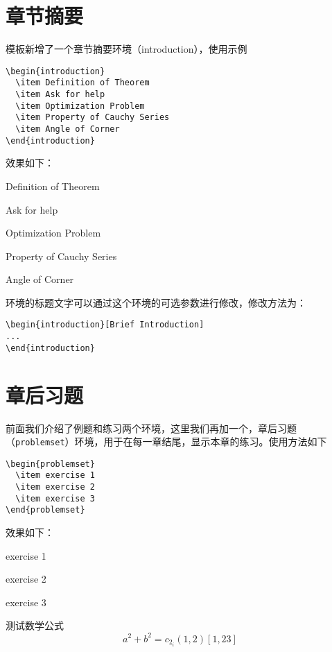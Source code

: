 \documentclass[cn,10pt,math=newtx,citestyle=gb7714-2015,bibstyle=gb7714-2015]{elegantbook}
\begin{document}
\section{章节摘要}
模板新增了一个章节摘要环境（introduction），使用示例
\begin{lstlisting}
\begin{introduction}
  \item Definition of Theorem
  \item Ask for help
  \item Optimization Problem
  \item Property of Cauchy Series
  \item Angle of Corner
\end{introduction}
\end{lstlisting}
效果如下：
\begin{introduction}
  \item Definition of Theorem
  \item Ask for help
  \item Optimization Problem
  \item Property of Cauchy Series
  \item Angle of Corner
\end{introduction}

环境的标题文字可以通过这个环境的可选参数进行修改，修改方法为：
\begin{lstlisting}
\begin{introduction}[Brief Introduction]
...
\end{introduction}
\end{lstlisting}

\section{章后习题}
前面我们介绍了例题和练习两个环境，这里我们再加一个，章后习题（\lstinline{problemset}）环境，用于在每一章结尾，显示本章的练习。使用方法如下

\begin{lstlisting}
\begin{problemset}
  \item exercise 1
  \item exercise 2
  \item exercise 3
\end{problemset}
\end{lstlisting}


效果如下：
\begin{problemset}
  \item exercise 1
  \item exercise 2
  \item exercise 3
  \item 测试数学公式
  \begin{equation}
    a^2+b^2=c_{2_{i}} (1,2) [1,23]
  \end{equation}
\end{problemset}
\end{document}
